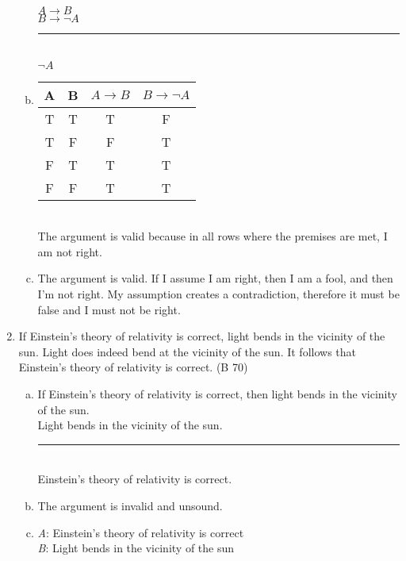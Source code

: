 \documentclass{article}
\begin{document}
\begin{enumerate}
\begin{enumerate}[(a)]
                        $A \to B$\\
                        $B \to \neg A$\\
                        \rule{5em}{.5pt}\\
                        $\neg A$
                  \item
                        \begin{tabular}{c|c|c|c}
                              A                      & B & $A \to B$ & $B \to \neg A$ \\
                              \hline
                              \rowcolor{lightgray} T & T & T         & F              \\
                              \rowcolor{lightgray} T & F & F         & T              \\
                              F                      & T & T         & T              \\
                              F                      & F & T         & T              \\
                        \end{tabular} \\
                        The argument is valid because in all rows where the premises are met, I am not right.\\
                  \item The argument is valid. If I assume I am right, then I am a fool, and then I'm not right. My assumption creates a contradiction, therefore it must be false and I must not be right.
            \end{enumerate}
      \item If Einstein's theory of relativity is correct, light bends in the vicinity of the sun. Light does indeed bend at the vicinity of the sun. It follows that Einstein's theory of relativity is correct. (B 70)
            \begin{enumerate}[(a)]
                  \item If Einstein's theory of relativity is correct, then light bends in the vicinity of the sun.\\
                        Light bends in the vicinity of the sun.\\
                        \rule{15em}{.5pt}\\
                        Einstein's theory of relativity is correct.
                  \item The argument is invalid and unsound.
                  \item \textit{A}: Einstein's theory of relativity is correct\\
                        \textit{B}: Light bends in the vicinity of the sun


\end{enumerate}
\end{enumerate}
\end{document}
